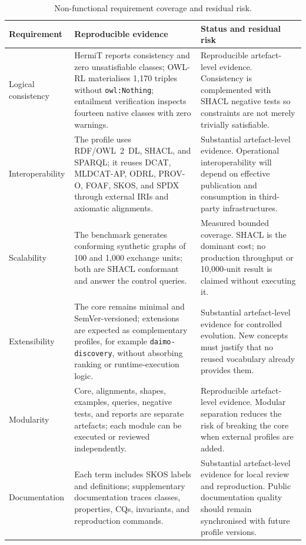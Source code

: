 \documentclass[Afour,sagev,times]{sagej}
\newcommand{\code}[1]{\texttt{#1}}
\begin{document}
\begin{table}[tb]
\scriptsize\sf\centering
\caption{Non-functional requirement coverage and residual risk.\label{tab:nfr-coverage}}
\begin{tabular}{@{}p{2.7cm}p{8.0cm}p{4.0cm}@{}}
\toprule
\textbf{Requirement} & \textbf{Reproducible evidence} & \textbf{Status and residual risk} \\
\midrule
Logical consistency & HermiT reports consistency and zero unsatisfiable classes; OWL-RL materialises 1,170 triples without \code{owl:Nothing}; entailment verification inspects fourteen native classes with zero warnings. & Reproducible artefact-level evidence. Consistency is complemented with SHACL negative tests so constraints are not merely trivially satisfiable. \\
Interoperability & The profile uses RDF/OWL~2~DL, SHACL, and SPARQL; it reuses DCAT, MLDCAT-AP, ODRL, PROV-O, FOAF, SKOS, and SPDX through external IRIs and axiomatic alignments. & Substantial artefact-level evidence. Operational interoperability will depend on effective publication and consumption in third-party infrastructures. \\
Scalability & The benchmark generates conforming synthetic graphs of 100 and 1,000 exchange units; both are SHACL conformant and answer the control queries. & Measured bounded coverage. SHACL is the dominant cost; no production throughput or 10,000-unit result is claimed without executing it. \\
Extensibility & The core remains minimal and SemVer-versioned; extensions are expected as complementary profiles, for example \code{daimo-discovery}, without absorbing ranking or runtime-execution logic. & Substantial artefact-level evidence for controlled evolution. New concepts must justify that no reused vocabulary already provides them. \\
Modularity & Core, alignments, shapes, examples, queries, negative tests, and reports are separate artefacts; each module can be executed or reviewed independently. & Reproducible artefact-level evidence. Modular separation reduces the risk of breaking the core when external profiles are added. \\
Documentation & Each term includes SKOS labels and definitions; supplementary documentation traces classes, properties, CQs, invariants, and reproduction commands. & Substantial artefact-level evidence for local review and reproduction. Public documentation quality should remain synchronised with future profile versions. \\
\bottomrule
\end{tabular}
\end{table}
\end{document}
